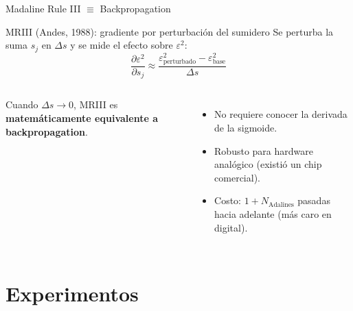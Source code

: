 \documentclass[aspectratio=169, 11pt, xcolor={dvipsnames,table}]{beamer}
\newcommand{\azul}[1]{\textcolor{UsachAzul}{#1}}
\begin{document}
\begin{frame}{Madaline Rule III $\equiv$ Backpropagation}
\begin{block}{MRIII (Andes, 1988): gradiente por perturbación del sumidero}
Se perturba la suma $s_j$ en $\Delta s$ y se mide el efecto sobre $\varepsilon^2$:
\[
\frac{\partial \varepsilon^2}{\partial s_j} \approx
\frac{\varepsilon^2_{\text{perturbado}} - \varepsilon^2_{\text{base}}}{\Delta s}
\]
\end{block}
\begin{columns}[T]
\begin{ideaclave}
Cuando $\Delta s \to 0$, MRIII es \textbf{matemáticamente equivalente a backpropagation}.
\end{ideaclave}
\begin{itemize}
  \item No requiere conocer la derivada de la sigmoide.
  \item \azul{Robusto} para hardware analógico (existió un chip comercial).
  \item Costo: $1+N_{\text{Adalines}}$ pasadas hacia adelante (más caro en digital).
\end{itemize}
\end{columns}
\end{frame}

\section{Experimentos}
\end{document}
